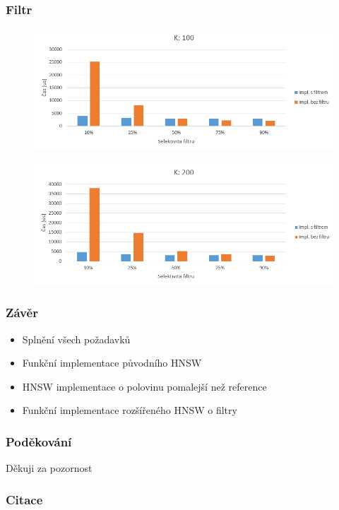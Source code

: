 \documentclass{beamer}
\begin{document}
	\begin{frame}
		\frametitle{Filtr}
		
		\begin{figure}
			\includegraphics[scale=0.4]{figures/graf_filtr_k100.png}
		\end{figure}
		
		\begin{figure}
			\includegraphics[scale=0.4]{figures/graf_filtr_k200.png}
		\end{figure}
		
	\end{frame}

	\begin{frame}
		\frametitle{Závěr}
		
		\begin{itemize}
			\item Splnění všech požadavků
			\item Funkční implementace původního HNSW
			\item HNSW implementace o polovinu pomalejší než reference
			\item Funkční implementace rozšířeného HNSW o filtry
		\end{itemize}
		
	\end{frame}

	\begin{frame}
		\frametitle{Poděkování}
		
		\begin{center}
			\Huge
			Děkuji za pozornost
		\end{center}
		
	\end{frame}

	\begin{frame}
		\frametitle{Citace}
		
		\nocite{*}
		
		\printbibliography
		
	\end{frame}
	
\end{document}
